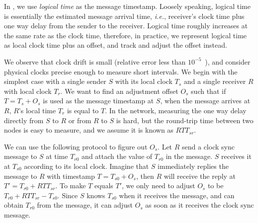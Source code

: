 {%

In \sys, we use \emph{logical time} as the message timestamp. Loosely speaking, logical time is essentially the estimated message arrival time, \emph{i.e.}, receiver's clock time plus one way delay from the sender to the receiver.
Logical time roughly increases at the same rate as the clock time, therefore, in practice, we represent logical time as local clock time plus an offset, and track and adjust the offset instead.

We observe that clock drift is small (relative error less than $10^{-5}$~\cite{corbett2013spanner,geng2018exploiting}), and consider physical clocks precise enough to measure short intervals. We begin with the simplest case with a single sender $S$ with its local clock $T_s$ and a single receiver $R$ with local clock $T_r$. We want to find an adjustment offset $O_s$ such that if $T = T_s + O_s$ is used as the message timestamp at $S$, when the message arrives at $R$, $R$'s local time $T_r$ is equal to $T$. In the network, measuring the one way delay directly from $S$ to $R$ or from $R$ to $S$ is hard, but the round-trip time between two nodes is easy to measure, and we assume it is known as $RTT_{sr}$.

We can use the following protocol to figure out $O_s$. Let $R$ send a clock sync message to $S$ at time $T_{r0}$ and attach the value of $T_{r0}$ in the message. $S$ receives it at $T_{s0}$ according to its local clock. Imagine that $S$ immediately replies the message to $R$ with timestamp $T = T_{s0} + O_s$, then $R$ will receive the reply at $T' = T_{r0} + RTT_{sr}$. To make $T$ equals $T'$, we only need to adjust $O_s$ to be $T_{r0} + RTT_{sr} - T_{s0}$. Since $S$ knows $T_{s0}$ when it receives the message, and can obtain $T_{r0}$ from the message, it can adjust $O_s$ as soon as it receives the clock sync message.



}
